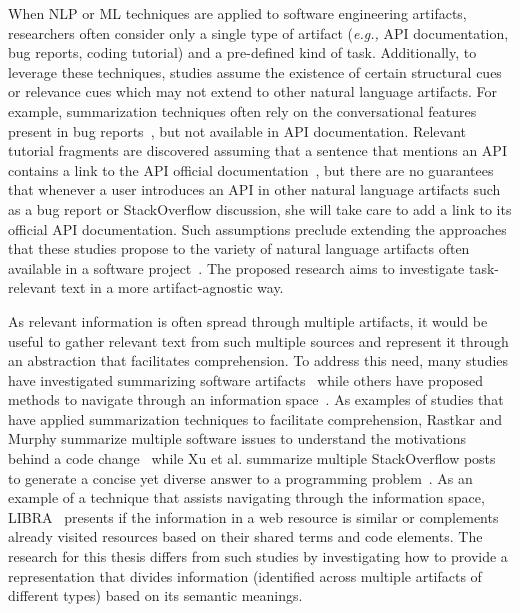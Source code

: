 When NLP or ML techniques are applied to software engineering artifacts, researchers often consider only a single type of artifact (\textit{e.g.,} API documentation, bug reports, coding tutorial) and a pre-defined kind of task.
Additionally, to leverage these techniques, studies assume the existence of certain structural cues or relevance cues
which may not extend to other natural language artifacts.
For example, summarization techniques
often rely on the conversational features present in bug reports~\cite{Lotufo2012, Mani2012},
but not available in API documentation.
Relevant tutorial fragments are discovered assuming that a sentence that mentions an API contains a link to the API official documentation~\cite{Jiang2017},
but there are no guarantees that whenever a user introduces an API
in other natural language artifacts such as a
bug report or StackOverflow discussion, she will take care
to add a link to its official API documentation.
Such assumptions preclude extending the approaches that these studies propose to
the variety of natural language artifacts often available in a software project~\cite{Bavota2016}.
The proposed research aims to investigate task-relevant text in a more artifact-agnostic way.






As relevant information is often spread through multiple artifacts, it would be useful to gather relevant text from such multiple sources and represent it through an abstraction that facilitates comprehension.
To address this need, many studies have investigated summarizing software artifacts~\cite{Goldsteinet1999, Ponzanelli2015, Rastkar2013, Xu2017}
while others have proposed methods to navigate through an information space~\cite{Ponzanelli2017, Aghajani2018}.
As examples of studies that have applied summarization techniques to facilitate comprehension,
Rastkar and Murphy summarize multiple software issues to understand the motivations behind a code change~\cite{Rastkar2013} while
Xu et al. summarize multiple StackOverflow posts to generate a concise yet diverse answer
to a programming problem~\cite{Xu2017}.
As an example of a technique that assists navigating through the information space,
LIBRA~\cite{Ponzanelli2017} presents if the information in a web resource is similar or complements already visited resources based on their shared terms and code elements.
The research for this thesis differs from such studies by investigating how to provide a representation that
divides information (identified across multiple artifacts of different types) based on its semantic meanings.




